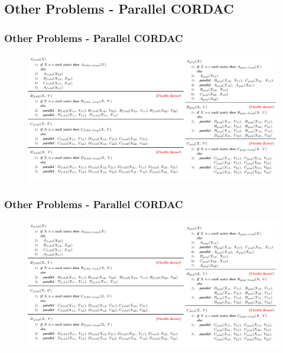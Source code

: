 \subsection{Other Problems - Parallel CORDAC}
\begin{frame}
    \frametitle{Other Problems - Parallel CORDAC}
    \begin{figure}
		\includegraphics[scale=0.2]{figure/fig-fold-gap-parallel.png}
	\end{figure}
\end{frame}

\begin{frame}
    \frametitle{Other Problems - Parallel CORDAC}
    \begin{figure}
		\includegraphics[scale=0.2]{figure/fig-fold-gap-parallel.png}
	\end{figure}
\end{frame}